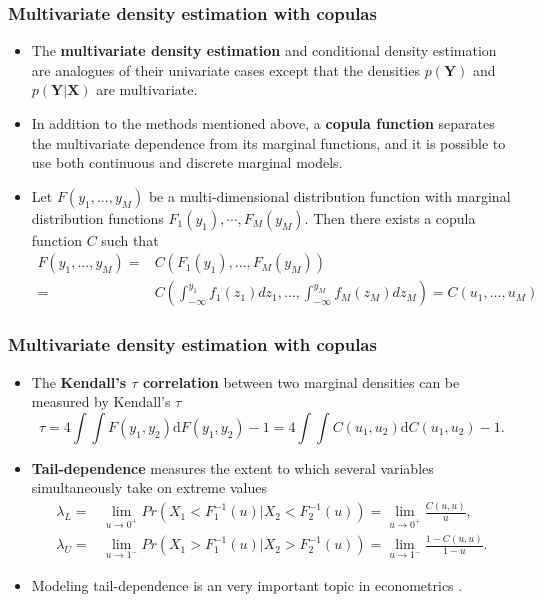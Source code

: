 \documentclass[10pt]{beamer}
\begin{document}
\begin{frame}
  \frametitle{Multivariate density estimation with copulas}
  \begin{itemize}
  \item The \textbf{multivariate density estimation} and conditional density estimation
    are analogues of their univariate cases except that the densities
    $p(\bm{Y})$ and $p(\bm{Y}|\bm{X})$ are multivariate.

  \item In addition to the methods mentioned above, a \textbf{copula function}
    separates the multivariate dependence from its marginal functions, and it
    is possible to use both continuous and discrete marginal models.

  \item Let $F(y_{1},...,y_{M})$ be a multi-dimensional distribution function
    with marginal distribution functions
    $F_{1}(y_{1}),\cdots,F_{M}(y_{M})$. Then there exists a copula function $C$
    \citep{sklar1959fonctions} such
    that
\[
\begin{split}F(y_{1},...,y_{M})= & C(F_{1}(y_{1}),...,F_{M}(y_{M}))\\
= & C\left(\int_{-\infty}^{y_{1}}f_{1}(z_{1})dz_{1},...,\int_{-\infty}^{y_{M}}f_{M}(z_{M})dz_{M}\right)=C(u_{1},...,u_{M})
\end{split}
\]
  \end{itemize}

\end{frame}


\begin{frame}
  \frametitle{Multivariate density estimation with copulas}

  \begin{itemize}
  \item The \textbf{Kendall's $\tau$ correlation} between two marginal
    densities can be measured by Kendall's $\tau$
    \[
    \tau=4\int\int F(y_{1},y_{2})\mathrm{d}F(y_{1},y_{2})-1=4\int\int
    C(u_{1},u_{2})\mathrm{d}C(u_{1},u_{2})-1.
    \]

  \item \textbf{Tail-dependence} measures the extent to which
several variables simultaneously take on extreme values
\[
\begin{split}\lambda_{L}= & \lim\limits _{u\to0^{+}}Pr(X_{1}<F_{1}^{-1}(u)|X_{2}<F_{2}^{-1}(u))=\lim\limits _{u\to0^{+}}\frac{C(u,u)}{u},\\
\lambda_{U}= & \lim\limits _{u\to1^{-}}Pr(X_{1}>F_{1}^{-1}(u)|X_{2}>F_{2}^{-1}(u))=\lim\limits _{u\to1^{-}}\frac{1-C(u,u)}{1-u}.
\end{split}
\]

\item Modeling tail-dependence is an very important topic in econometrics
  \citep{joe1997multivariate} \citep{patton2012review}.

  \end{itemize}



\end{frame}
\end{document}
